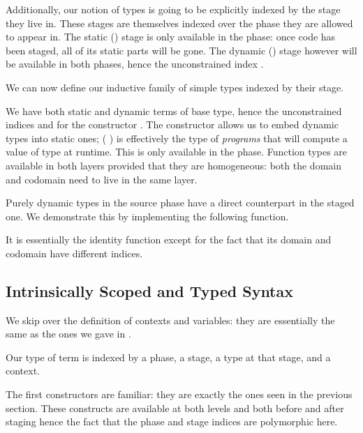 
Additionally, our notion of types is going to be explicitly
indexed by the stage they live in. These stages are themselves
indexed over the phase they are allowed to appear in.
%
The static () stage is only available in the 
phase: once code has been staged, all of its static parts will
be gone.
%
The dynamic () stage however will be available in both
phases, hence the unconstrained index .


We can now define our inductive family of simple types indexed
by their stage.


We have both static and dynamic terms of base type,
hence the unconstrained indices  and 
for the constructor .
%
The constructor  allows us to embed dynamic
types into static ones; ( ) is effectively
the type of \emph{programs} that will compute a value of
type  at runtime. This is only available in the
 phase.
%
Function types are available in both layers provided that
they are homogeneous: both the domain and codomain need
to live in the same layer.

Purely dynamic types in the source phase have a direct
counterpart in the staged one. We demonstrate this by
implementing the following  function.


It is essentially the identity function except for the
fact that its domain and codomain have different indices.

\subsection{Intrinsically Scoped and Typed Syntax}

We skip over the definition of contexts and variables: they
are essentially the same as the ones we gave in .

Our type of term is indexed by a phase, a stage, a type
at that stage, and a context.


The first constructors are familiar: they are exactly the ones
seen in the previous section. These constructs are available
at both levels and both before and after staging hence the fact
that the phase and stage indices are polymorphic here.

